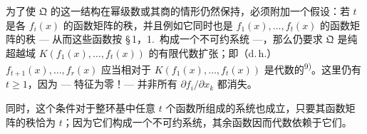 为了使 $\mathfrak{Q}$ 的这一结构在幂级数或其商的情形仍然保持，必须附加一个假设：若 $t$ 是各 $f_i(x)$ 的函数矩阵的秩，并且例如它同时也是 $f_1(x),\ldots,f_t(x)$ 的函数矩阵的秩 --- 从而这些函数按 \S\,1，1.\ 构成一个不可约系统 ---，那么仍要求 $\mathfrak{Q}$ 是纯超越域 $K(f_1(x),\ldots,f_t(x))$ 的有限代数扩张；即（d.\,h.）$f_{t+1}(x),\ldots,f_r(x)$ 应当相对于 $K(f_1(x),\ldots,f_t(x))$ 是代数的\textsuperscript{9)}。这里仍有 $t \geq 1$，因为 --- 特征为零！--- 并非所有 $\partial f_i/\partial x_k$ 都消失。

同时，这个条件对于整环基中任意 $t$ 个函数所组成的系统也成立，只要其函数矩阵的秩恰为 $t$；因为它们构成一个不可约系统，其余函数因而代数依赖于它们。
